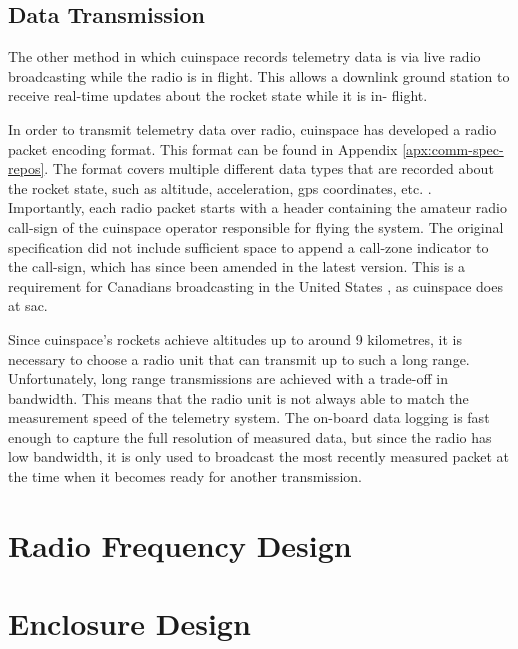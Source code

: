 \subsection{Data Transmission}

The other method in which \gls{cuinspace} records telemetry data is via live radio broadcasting while the radio is in
flight. This allows a downlink ground station to receive real-time updates about the rocket state while it is in-
flight.

In order to transmit telemetry data over radio, \gls{cuinspace} has developed a radio packet encoding format. This
format can be found in Appendix \ref{apx:comm-spec-repos}. The format covers multiple different data types that are
recorded about the rocket state, such as altitude, acceleration, \gls{gps} coordinates, etc. \cite{radio-comms}.
Importantly, each radio packet starts with a header containing the amateur radio call-sign of the \gls{cuinspace}
operator responsible for flying the system. \cite{radio-comms} The original specification did not include sufficient
space to append a call-zone indicator to the call-sign, which has since been amended in the latest version. This is a
requirement for Canadians broadcasting in the United States \cite{foreign-broadcast}, as \gls{cuinspace} does at
\gls{sac}.

Since \gls{cuinspace}'s rockets achieve altitudes up to around 9 kilometres, it is necessary to choose a radio unit
that can transmit up to such a long range. Unfortunately, long range transmissions are achieved with a trade-off in
bandwidth. This means that the radio unit is not always able to match the measurement speed of the telemetry system.
The on-board data logging is fast enough to capture the full resolution of measured data, but since the radio has low
bandwidth, it is only used to broadcast the most recently measured packet at the time when it becomes ready for another
transmission.

\section{Radio Frequency Design}


\section{Enclosure Design}

